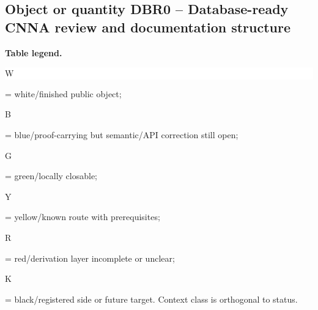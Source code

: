 \subsection*{Object or quantity DBR0 -- Database-ready CNNA review and documentation structure}
\hypertarget{objproof:DBR0}{}
\par\smallskip\noindent\begin{minipage}{0.99\linewidth}\footnotesize\raggedright\textbf{Table legend.} \colorbox{white}{\strut W} = white/finished public object; \colorbox{cyan!20}{\strut B} = blue/proof-carrying but semantic/API correction still open; \colorbox{green!18}{\strut G} = green/locally closable; \colorbox{yellow!25}{\strut Y} = yellow/known route with prerequisites; \colorbox{red!20}{\strut R} = red/derivation layer incomplete or unclear; \colorbox{black!18}{\strut K} = black/registered side or future target. Context class is orthogonal to status.\end{minipage}\par\vspace{0.25em}

